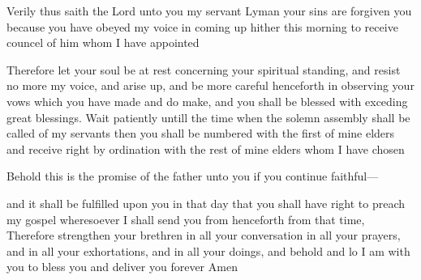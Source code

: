 				Verily thus saith the Lord unto you my servant Lyman your sins are forgiven you because you have obeyed my voice in coming up hither this morning to receive councel of him whom I have appointed
				
				Therefore let your soul be at rest concerning your spiritual standing, and resist no more my voice, and arise up, and be more careful henceforth in observing your vows which you have made and do make, and you shall be blessed with exceding great blessings. Wait patiently untill the time when the solemn assembly shall be called of my servants then you shall be numbered with the first of mine elders and receive right by ordination with the rest of mine elders whom I have chosen
				
				Behold this is the promise of the father unto you if you continue faithful---
				
				and it shall be fulfilled upon you in that day that you shall have right to preach my gospel wheresoever I shall send you from henceforth from that time, Therefore strengthen your brethren in all your conversation in all your prayers, and in all your exhortations, and in all your doings, and behold and lo I am with you to bless you and deliver you forever Amen

\pagebreak{}
